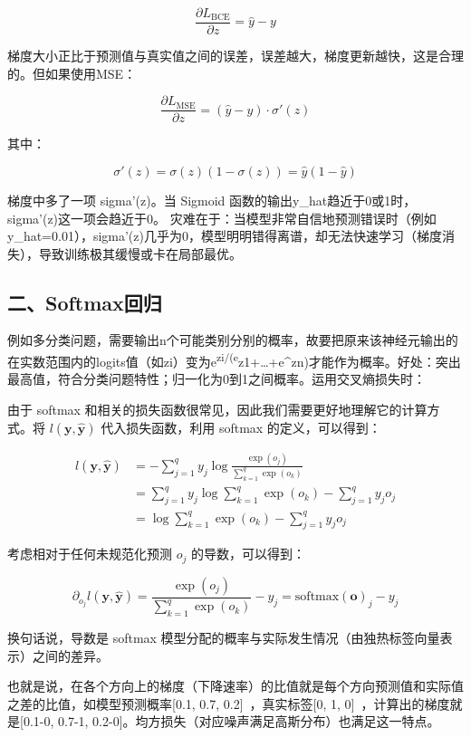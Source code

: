 \[
\frac{\partial L_{\mathrm{BCE}}}{\partial z}=\hat{y}-y
\]

梯度大小正比于预测值与真实值之间的误差，误差越大，梯度更新越快，这是合理的。但如果使用MSE：

\[
\frac{\partial L_{\mathrm{MSE}}}{\partial z}=(\hat{y}-y)\cdot\sigma'(z)
\]

其中：

\[
\sigma'(z)=\sigma(z)(1-\sigma(z))=\hat{y}(1-\hat{y})
\]

梯度中多了一项 sigma'(z)。当 Sigmoid 函数的输出y\_hat趋近于0或1时，sigma'(z)这一项会趋近于0。 灾难在于：当模型非常自信地预测错误时（例如y\_hat=0.01），sigma'(z)几乎为0，模型明明错得离谱，却无法快速学习（梯度消失），导致训练极其缓慢或卡在局部最优。

\hypertarget{ux4e8csoftmaxux56deux5f52}{%
\subsection{二、Softmax回归}\label{ux4e8csoftmaxux56deux5f52}}

例如多分类问题，需要输出n个可能类别分别的概率，故要把原来该神经元输出的在实数范围内的logits值（如zi）变为e\textsuperscript{zi/(e}z1+\ldots+e\^{}zn)才能作为概率。好处：突出最高值，符合分类问题特性；归一化为0到1之间概率。运用交叉熵损失时：

由于 softmax 和相关的损失函数很常见，因此我们需要更好地理解它的计算方式。将 \(l(\mathbf{y},\hat{\mathbf{y}})\) 代入损失函数，利用 softmax 的定义，可以得到：

\[
\begin{aligned}
l(\mathbf{y},\hat{\mathbf{y}})
&=-\sum_{j=1}^{q}y_j\log\frac{\exp(o_j)}{\sum_{k=1}^{q}\exp(o_k)}\\
&=\sum_{j=1}^{q}y_j\log\sum_{k=1}^{q}\exp(o_k)-\sum_{j=1}^{q}y_jo_j\\
&=\log\sum_{k=1}^{q}\exp(o_k)-\sum_{j=1}^{q}y_jo_j
\end{aligned}
\]

考虑相对于任何未规范化预测 \(o_j\) 的导数，可以得到：

\[
\partial_{o_j}l(\mathbf{y},\hat{\mathbf{y}})
=\frac{\exp(o_j)}{\sum_{k=1}^{q}\exp(o_k)}-y_j
=\mathrm{softmax}(\mathbf{o})_j-y_j
\]

换句话说，导数是 softmax 模型分配的概率与实际发生情况（由独热标签向量表示）之间的差异。

也就是说，在各个方向上的梯度（下降速率）的比值就是每个方向预测值和实际值之差的比值，如模型预测概率{[}0.1, 0.7, 0.2{]}~，真实标签{[}0, 1, 0{]}~，计算出的梯度就是{[}0.1-0, 0.7-1, 0.2-0{]}。均方损失（对应噪声满足高斯分布）也满足这一特点。


